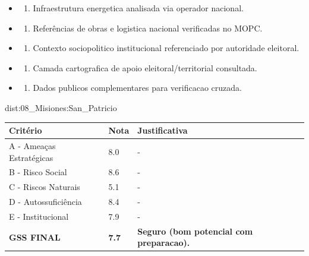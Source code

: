 {\begin{itemize}
\item
  \begin{enumerate}
  \def\labelenumi{\arabic{enumi})}
  \setcounter{enumi}{7}
  \tightlist
  \item
    Infraestrutura energetica analisada via operador nacional.
  \end{enumerate}
\item
  \begin{enumerate}
  \def\labelenumi{\arabic{enumi})}
  \setcounter{enumi}{8}
  \tightlist
  \item
    Referências de obras e logistica nacional verificadas no MOPC.
  \end{enumerate}
\item
  \begin{enumerate}
  \def\labelenumi{\arabic{enumi})}
  \setcounter{enumi}{9}
  \tightlist
  \item
    Contexto sociopolitico institucional referenciado por autoridade
    eleitoral.
  \end{enumerate}
\item
  \begin{enumerate}
  \def\labelenumi{\arabic{enumi})}
  \setcounter{enumi}{10}
  \tightlist
  \item
    Camada cartografica de apoio eleitoral/\allowbreak territorial consultada.
  \end{enumerate}
\item
  \begin{enumerate}
  \def\labelenumi{\arabic{enumi})}
  \setcounter{enumi}{11}
  \tightlist
  \item
    Dados publicos complementares para verificacao cruzada.
  \end{enumerate}
\end{itemize}}{dist:08_Misiones:San_Patricio}
\begin{table}[ht!]
\small \begin{tabular}{p{3.0cm}p{0.8cm}p{6.0cm}} \toprule
\textbf{Critério} & \textbf{Nota} & \textbf{Justificativa} \\ \midrule
A - Ameaças Estratégicas & 8.0 & - \\
B - Risco Social & 8.6 & - \\
C - Riscos Naturais & 5.1 & - \\
D - Autossuficiência & 8.4 & - \\
E - Institucional & 7.9 & - \\
\midrule \textbf{GSS FINAL} & \textbf{7.7} & \textbf{Seguro (bom potencial com preparacao).} \\ \bottomrule \end{tabular}
\end{table}

